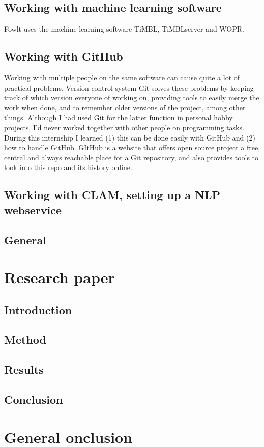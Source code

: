 \documentclass[12pt]{article}
\begin{document}

\subsection{Working with machine learning software}
Fowlt uses the machine learning software TiMBL, TiMBLserver and WOPR.


\subsection{Working with GitHub}
Working with multiple people on the same software can cause quite a lot of practical problems. Version control system Git solves these problems by keeping track of which version everyone of working on, providing tools to easily merge the work when done, and to remember older versions of the project, among other things. Although I had used Git for the latter function in personal hobby projects, I'd never worked together with other people on programming tasks. During this internship I learned (1) this can be done easily with GitHub and (2) how to handle GitHub. GItHub is a website that offers open source project a free, central and always reachable place for a Git repository, and also provides tools to look into this repo and its history online.

\subsection{Working with CLAM, setting up a NLP webservice}

\subsection{General}

\section{Research paper}

\subsection{Introduction}

\subsection{Method}

\subsection{Results}

\subsection{Conclusion}

\section{General onclusion}
\end{document}
